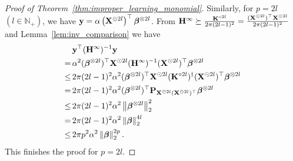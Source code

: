 \begin{proof}[Proof of Theorem~\ref{thm:improper_learning_monomial}]
	 
	 Similarly, for $p=2l$ $(l\in\mathbb N_+)$, we have $\mathbf{y}  = \alpha \left( \mathbf{X}^{\odot 2l} \right)^\top \bm{\beta}^{\otimes 2l}$. From
	 $ \mathbf{H}^{\infty} \succeq \frac{\mathbf{K}^{\circ 2l}}{2\pi(2l-1)^2} = \frac{(\mathbf{X}^{\odot 2l})^\top \mathbf{X}^{\odot 2l}}{2\pi (2l-1)^2}$ and Lemma~\ref{lem:inv_comparison} we have
	 \begin{align*}
	&\mathbf{y}^\top (\mathbf{H}^{\infty})^{-1}  \mathbf{y}\\
	 =\, & \alpha^2 (\bm{\beta}^{\otimes 2l})^\top\mathbf{X}^{\odot 2l} (\mathbf{H}^{\infty})^{-1}    (\mathbf{X}^{\odot 2l})^\top \bm{\beta}^{\otimes 2l}\\
	 \le\, & 2\pi(2l-1)^2  \alpha^2  (\bm{\beta}^{\otimes 2l})^\top\mathbf{X}^{\odot 2l} (\mathbf{K}^{\circ 2l})^{\dag}    (\mathbf{X}^{\odot 2l})^\top \bm{\beta}^{\otimes 2l}\\
	 =\, &2\pi(2l-1)^2 \alpha^2    (\bm{\beta}^{\otimes 2l})^\top \mathbf{P}_{\mathbf{X}^{\odot 2l} (\mathbf{X}^{\odot 2l})^\top} \bm{\beta}^{\otimes 2l}\\
	 \le\, & 2\pi (2l-1)^2  \alpha^2   \left\|\bm{\beta}^{\otimes 2l}\right\|_2^2\\
	 =\, &2\pi (2l-1)^2 \alpha^2  \left\|\bm{\beta}\right\|_2^{4l}\\
	 \le\,& 2\pi p^2 \alpha^2  \left\|\bm{\beta}\right\|_2^{2p}.
	 \end{align*}
	 This finishes the proof for $p=2l$.
%	

\end{proof}
